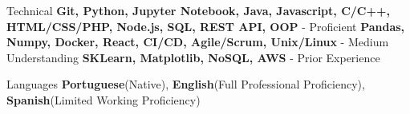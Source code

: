 
\begin{cvskills}
  \cvskill
    {Technical} %
    {\textbf{Git, Python, Jupyter Notebook, Java, Javascript, C/C++, HTML/CSS/PHP, Node.js, SQL, REST API, OOP} - Proficient \break \textbf{Pandas, Numpy, Docker, React, CI/CD, Agile/Scrum, Unix/Linux} - Medium Understanding \break \textbf{SKLearn, Matplotlib, NoSQL, AWS} - Prior Experience} %

  \cvskill
    {Languages} %
    {\textbf{Portuguese}(Native), \textbf{English}(Full Professional Proficiency), \textbf{Spanish}(Limited Working Proficiency)} %

\end{cvskills}